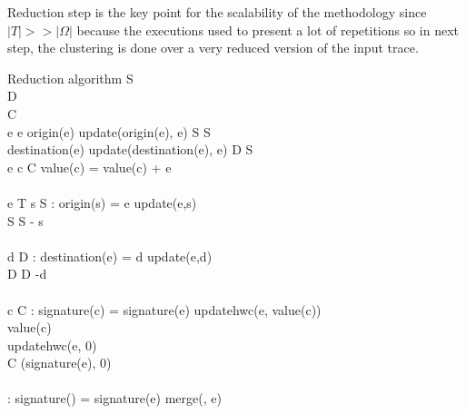 Reduction step is the key point for 
the scalability of the methodology since $|T| >> |\Omega|$ because the executions 
used to present a lot of repetitions so in next step, the clustering is done over a very 
reduced version of the input trace.

\begin{pseudocode}{Reduction algorithm}{\Sigma}
\label{pc:reduction_phase}
    S \GETS \emptyset \medspace
     \\
    D \GETS \emptyset \medspace
     \\
    C \GETS \emptyset \medspace
     \\
    \FORALL e \in \Sigma \DO 
	\BEGIN 
        \IF e \in \Psi \THEN
        \BEGIN
            \IF origin(e) \in \Omega \THEN
                update(origin(e), e)
            \ELSE
                S \GETS S 
            \\
            \IF destination(e) \in \Omega \THEN
                update(destination(e), e)
            \ELSE
                D \GETS S 
        \END
        \\
        \ELSEIF e \in \Delta \THEN
        \BEGIN
            \FORALL c \in C \DO
                value(c) = value(c) + e\\
        \END
        \\
        \ELSEIF e \in T \THEN
        \BEGIN
            \IF \exists s \in S : origin(s) = e \THEN
            \BEGIN
                update(e,s)\\
                S \GETS S - {s}\\
            \END
            \\
            \IF \exists d \in D : destination(e) = d \THEN
            \BEGIN
                update(e,d)\\
                D \GETS D -{d}\\
            \END
            \\
            \IF \exists c \in C : signature(c) = signature(e)
            \THEN
            \BEGIN
                updatehwc(e, value(c))\\
                value(c) \\
            \END
            \ELSE
            \BEGIN
                updatehwc(e, 0)\\
                C \gets (signature(e), 0)\\
            \END
            \\
            \IF \exists \omega \in \Omega : signature(\omega) = signature(e)
            \THEN
                merge(\omega, e)
            \ELSE
                \Omega \GETS \Omega {}
        \END
	\END
	\\

    \RETURN \Omega
\end{pseudocode}

